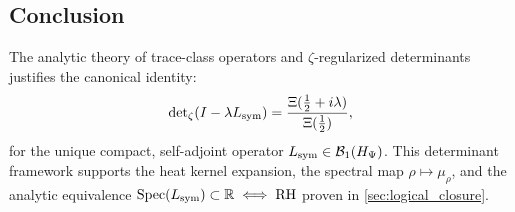 \subsection*{Conclusion}

The analytic theory of trace-class operators and \(\zeta\)-regularized determinants justifies the canonical identity:
\[
\det\nolimits_\zeta(I - \lambda L_{\mathrm{sym}}) = \frac{\Xi(\tfrac{1}{2} + i\lambda)}{\Xi(\tfrac{1}{2})},
\]
for the unique compact, self-adjoint operator \( L_{\mathrm{sym}} \in \mathcal{B}_1(H_{\Psi}) \). This determinant framework supports the heat kernel expansion, the spectral map \( \rho \mapsto \mu_\rho \), and the analytic equivalence \( \operatorname{Spec}(L_{\mathrm{sym}}) \subset \mathbb{R} \iff \mathrm{RH} \) proven in \cref{sec:logical_closure}.
